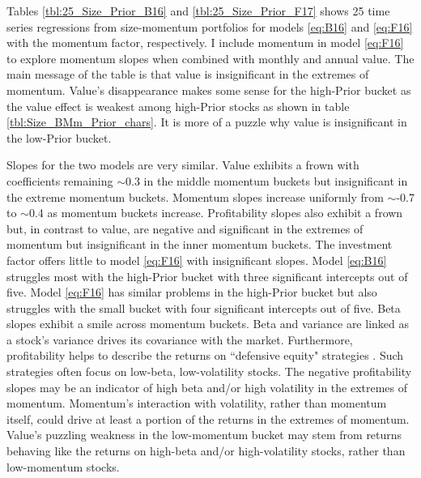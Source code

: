 
Tables \ref{tbl:25_Size_Prior_B16} and \ref{tbl:25_Size_Prior_F17} shows 25
time series regressions from size-momentum portfolios for models
\ref{eq:B16} and \ref{eq:F16} with the momentum factor, respectively.
I include momentum in
model \ref{eq:F16} to explore momentum slopes when combined with monthly and
annual value.
The main message of the table is that value is insignificant in the extremes
of momentum.
Value's disappearance makes some sense for the high-Prior bucket as the value
effect is weakest among high-Prior stocks as shown in table
\ref{tbl:Size_BMm_Prior_chars}.
It is more of a puzzle why value is insignificant in the low-Prior bucket.

Slopes for the two models are very similar.
Value exhibits a frown with coefficients remaining $\sim$0.3 in the middle
momentum buckets but insignificant in the extreme momentum buckets.
Momentum slopes increase uniformly from $\sim$-0.7 to $\sim$0.4 as momentum
buckets increase.
Profitability slopes also exhibit a frown but, in contrast to value, are
negative and significant in the extremes of momentum but insignificant
in the inner momentum buckets.
The investment factor offers little to model \ref{eq:F16} with insignificant
slopes.
Model \ref{eq:B16} struggles most with the high-Prior bucket with three
significant intercepts out of five.
Model \ref{eq:F16} has similar problems in the high-Prior bucket but also
struggles with the small bucket with four significant intercepts out of five.
Beta slopes exhibit a smile across momentum buckets. Beta and variance are
linked as a stock's variance drives its covariance with the market.
Furthermore, profitability helps to describe the returns on ``defensive equity"
strategies \parencite{novy2014understanding}.
Such strategies often focus on low-beta, low-volatility stocks.
The negative profitability slopes may be an indicator of high beta and/or
high volatility in the extremes of momentum.
Momentum's interaction with volatility, rather than momentum itself, could
drive at least a portion of the returns in the extremes of momentum.
Value's puzzling weakness in the low-momentum bucket may stem from returns
behaving like the returns on high-beta and/or high-volatility stocks,
rather than low-momentum stocks.

